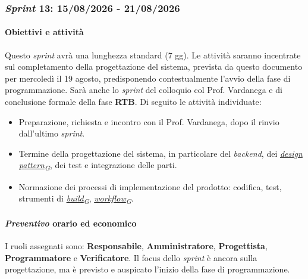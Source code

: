 \documentclass[12pt, a4paper]{article}
\newcommand{\urlglossario}{https://skynetunigroup.github.io/Code_Guardian/Documentazione/PB/glossario_v2.0.0.pdf} %
\newcommand{\glo}[2]{\href{\urlglossario\#nameddest=#2}{#1\textsubscript{G}}}
\begin{document}
{\subsubsection{\textit{Sprint} 13: 15/08/2026 - 21/08/2026}

\paragraph{Obiettivi e attività}

Questo \textit{sprint} avrà una lunghezza standard (7 gg). Le attività saranno incentrate sul completamento della progettazione del sistema, prevista da questo documento per mercoledì il 19 agosto, predisponendo contestualmente l'avvio della fase di programmazione. Sarà anche lo \textit{sprint} del colloquio col Prof. Vardanega e di conclusione formale della fase \textbf{RTB}. Di seguito le attività individuate:

\begin{itemize}
    \item Preparazione, richiesta e incontro con il Prof. Vardanega, dopo il rinvio dall'ultimo \textit{sprint}.
    \item Termine della progettazione del sistema, in particolare del \textit{backend}, dei \textit{\glo{design pattern}{design-pattern}}, dei test e integrazione delle parti.
    \item Normazione dei processi di implementazione del prodotto: codifica, test, strumenti di \textit{\glo{build}{build}}, \textit{\glo{workflow}{workflow}}.
\end{itemize}

\paragraph{\textit{Preventivo} orario ed economico}

I ruoli assegnati sono: \textbf{Responsabile}, \textbf{Amministratore}, \textbf{Progettista}, \textbf{Programmatore} e \textbf{Verificatore}. Il focus dello \textit{sprint} è ancora sulla progettazione, ma è previsto e auspicato l'inizio della fase di programmazione.

}
\end{document}
